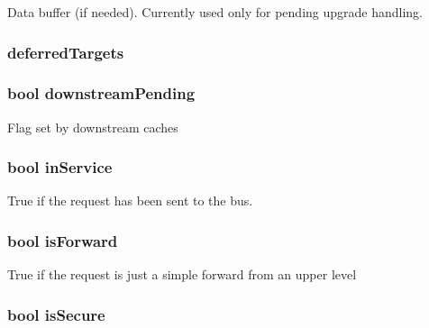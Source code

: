 Data buffer (if needed). Currently used only for pending upgrade handling. \hypertarget{classMSHR_ab53d68e3f8e523ab7907b830d22bd35d}{
\subsubsection[{deferredTargets}]{ {\bf deferredTargets}}}
\label{classMSHR_ab53d68e3f8e523ab7907b830d22bd35d}
\hypertarget{classMSHR_a5ea3d1c4eadd163d5f9bd35927044ed5}{
\subsubsection[{downstreamPending}]{\setlength{\rightskip}{0pt plus 5cm}bool {\bf downstreamPending}}}
\label{classMSHR_a5ea3d1c4eadd163d5f9bd35927044ed5}
Flag set by downstream caches \hypertarget{classMSHR_a7f5c4fb6e9162689992ccd0cd7bce17b}{
\subsubsection[{inService}]{\setlength{\rightskip}{0pt plus 5cm}bool {\bf inService}}}
\label{classMSHR_a7f5c4fb6e9162689992ccd0cd7bce17b}
True if the request has been sent to the bus. \hypertarget{classMSHR_a9b36b981f171b10bc35fbd5f79c3bae1}{
\subsubsection[{isForward}]{\setlength{\rightskip}{0pt plus 5cm}bool {\bf isForward}}}
\label{classMSHR_a9b36b981f171b10bc35fbd5f79c3bae1}
True if the request is just a simple forward from an upper level \hypertarget{classMSHR_a62bc84f4251f16cf0cfa0f8d96e00c37}{
\subsubsection[{isSecure}]{\setlength{\rightskip}{0pt plus 5cm}bool {\bf isSecure}}}
